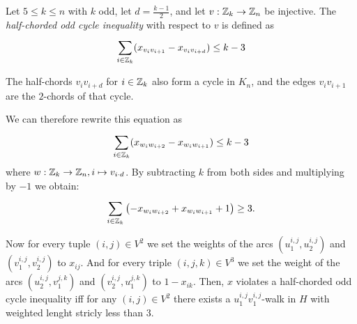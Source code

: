 \begin{definition}\label{def:half-chorded}
Let $5 \leq k \leq n$ with $k$ odd, let $d = \frac{k-1}{2}$, and let $v: \mathbb{Z}_{k} \to \mathbb{Z}_{n}$ be injective.
The \textit{half-chorded odd cycle inequality} with respect to $v$ is defined as
\begin{equation}\label{eq:half-chorded}
	\sum_{i \in \mathbb{Z}_{k}}^{} (x_{v_{i} v_{i+1}} - x_{v_{i} v_{i+d} }) \leq k - 3
\end{equation}
\end{definition}
\begin{note}
	The half-chords $v_{i}v_{i+d}$ for $i \in \mathbb{Z}_{k}$ also form a cycle in $K_{n}$, and the edges $v_{i}v_{i+1}$ are the $2$-chords of that cycle.
\end{note}
We can therefore rewrite this equation as
\begin{equation*}
\sum_{i \in \mathbb{Z}_{k}}^{} (x_{w_{i}w_{i+2}} - x_{w_{i}w_{i+1}}) \leq k-3
\end{equation*}
where $w: \mathbb{Z}_{k} \to \mathbb{Z}_{n}, i \mapsto v_{i \cdot d}$.
By subtracting $k$ from both sides and multiplying by $-1$ we obtain:
\begin{equation*}
	\sum_{i \in \mathbb{Z}_{k}}^{} \left( -x_{w_{i}w_{i+2}} + x_{w_{i}w_{i+1}} + 1 \right) \geq 3.
\end{equation*}

Now for every tuple $(i,j) \in V^{2}$ we set the weights of the arcs $(u_{1}^{i,j}, u_{2}^{i,j})$ and $(v_{1}^{i,j}, v_{2}^{i,j})$ to $x_{ij}$.
And for every triple $(i,j,k) \in V^{3}$ we set the weight of the arcs $(u_{2}^{i,j}, v_{1}^{j,k})$ and $(v_{2}^{i,j}, u_{1}^{j,k})$ to $1-x_{ik}$.
Then, $x$ violates a half-chorded odd cycle inequality iff for any $(i,j) \in V^{2}$ there exists a $u_{1}^{i,j}v_{1}^{i,j}$-walk in $H$ with weighted lenght stricly less than 3.
